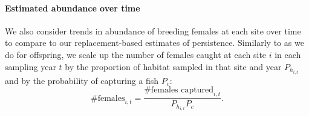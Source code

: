 \documentclass[12pt, oneside]{article}   	%
\begin{document}




\paragraph*{Estimated abundance over time}

We also consider trends in abundance of breeding females at each site over time to compare to our replacement-based estimates of persistence. Similarly to as we do for offspring, we scale up the number of females caught at each site $i$ in each sampling year $t$ by the proportion of habitat sampled in that site and year $P_{h_{i,t}}$ and by the probability of capturing a fish $P_c$:
\begin{equation}
\text{\# females}_{i,t} = \frac{\text{\# females captured}_{i,t}}{P_{h_{i,t}}P_c}. \label{EQN_FemaleAbundance}
\end{equation}
\end{document}
